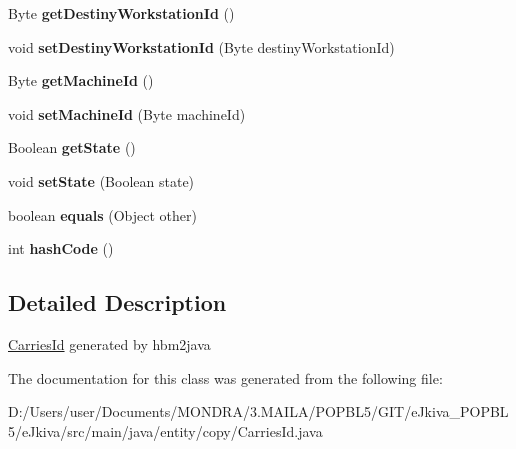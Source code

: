 \begin{DoxyCompactItemize}
\mbox{\label{classentity_1_1copy_1_1_carries_id_a3b92926f9d7d04700658a2ca09c1949b}} 
Byte {\bfseries get\+Destiny\+Workstation\+Id} ()
\item 
\mbox{\label{classentity_1_1copy_1_1_carries_id_af2e185e73b174cecc828ff9f37e2adcb}} 
void {\bfseries set\+Destiny\+Workstation\+Id} (Byte destiny\+Workstation\+Id)
\item 
\mbox{\label{classentity_1_1copy_1_1_carries_id_a49ff35e89fb8daa8ba192018570a9943}} 
Byte {\bfseries get\+Machine\+Id} ()
\item 
\mbox{\label{classentity_1_1copy_1_1_carries_id_adf6dfc721ab97c887eff0950c6d96cf5}} 
void {\bfseries set\+Machine\+Id} (Byte machine\+Id)
\item 
\mbox{\label{classentity_1_1copy_1_1_carries_id_a7756055589896e6afd6e8310afa760a8}} 
Boolean {\bfseries get\+State} ()
\item 
\mbox{\label{classentity_1_1copy_1_1_carries_id_aac9c996ac0331aa86aca3c99563c60a1}} 
void {\bfseries set\+State} (Boolean state)
\item 
\mbox{\label{classentity_1_1copy_1_1_carries_id_a0975b7c3dfab07c82b06b04efdce801f}} 
boolean {\bfseries equals} (Object other)
\item 
\mbox{\label{classentity_1_1copy_1_1_carries_id_afa655532570f3accf87116cea68afa61}} 
int {\bfseries hash\+Code} ()
\end{DoxyCompactItemize}


\subsection{Detailed Description}
\mbox{\hyperlink{classentity_1_1copy_1_1_carries_id}{Carries\+Id}} generated by hbm2java 

The documentation for this class was generated from the following file\+:\begin{DoxyCompactItemize}
\item 
D\+:/\+Users/user/\+Documents/\+M\+O\+N\+D\+R\+A/3.\+M\+A\+I\+L\+A/\+P\+O\+P\+B\+L5/\+G\+I\+T/e\+Jkiva\+\_\+\+P\+O\+P\+B\+L5/e\+Jkiva/src/main/java/entity/copy/Carries\+Id.\+java\end{DoxyCompactItemize}
